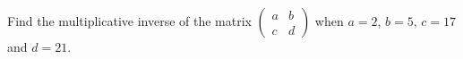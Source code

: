Find the multiplicative inverse of the matrix $\begin{pmatrix}a&b\\c&d\end{pmatrix}$ when $a=2$, $b=5$, $c=17$ and $d=21$.
